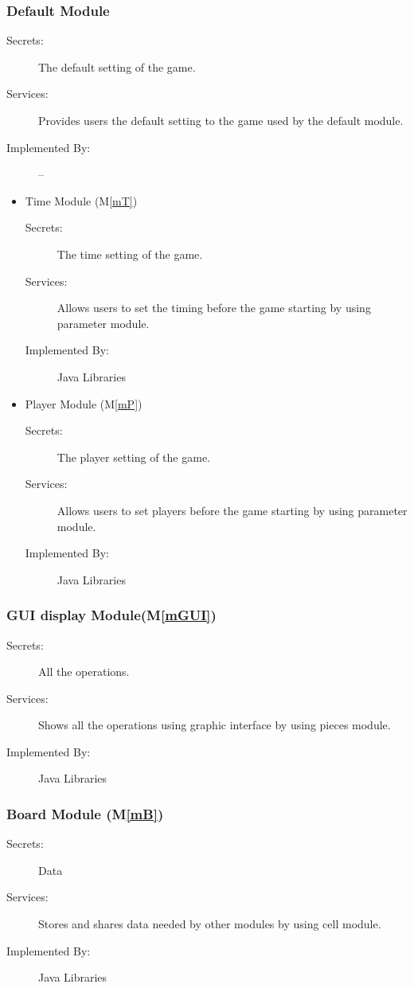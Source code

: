 \documentclass[12pt, titlepage]{article}
\newcommand{\mref}[1]{M\ref{#1}}
\begin{document}
\subsubsection{Default Module}
\begin{description}
\item[Secrets:]The default setting of the game.
\item[Services:]Provides users the default setting to the game used by the default module.
\item[Implemented By:]--
\end{description}

\begin{itemize}
\item{Time Module (\mref{mT})}
\begin{description}
\item[Secrets:] The time setting of the game. 
\item[Services:] Allows users to set the timing before the game starting by using parameter module. 
\item[Implemented By:] Java Libraries
\end{description}
\end{itemize}

\begin{itemize}
\item{Player Module (\mref{mP})}
\begin{description}
\item[Secrets:]The player setting of the game. 
\item[Services:] Allows users to set players before the game starting by using parameter module.
\item[Implemented By:] Java Libraries
\end{description}
\end{itemize}


\subsubsection{GUI display Module(\mref{mGUI})}
\begin{description}
\item[Secrets:] All the operations.
\item[Services:] Shows all the operations using graphic interface by using pieces module.
\item[Implemented By:] Java Libraries
\end{description}


\subsubsection{Board Module (\mref{mB})}
\begin{description}
\item[Secrets:]Data
\item[Services:]Stores and shares data needed by other modules by using cell module.
\item[Implemented By:] Java Libraries
\end{description}
\end{document}
